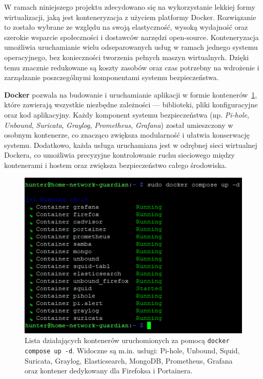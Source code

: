 \documentclass[
    left=2.5cm,         %
    right=2.5cm,        %
    top=2.5cm,          %
    bottom=3cm,         %
    bindingoffset=6mm,  %
    nohyphenation=true %
]{eiti/eiti-thesis} %
\begin{document}
W ramach niniejszego projektu zdecydowano się na wykorzystanie lekkiej formy wirtualizacji, jaką jest konteneryzacja z użyciem platformy Docker\cite{docker-wiki}. Rozwiązanie to zostało wybrane ze względu na swoją elastyczność, wysoką wydajność oraz szerokie wsparcie społeczności i dostawców narzędzi open-source. Konteneryzacja umożliwia uruchamianie wielu odseparowanych usług w ramach jednego systemu operacyjnego, bez konieczności tworzenia pełnych maszyn wirtualnych. Dzięki temu znacznie redukowane są koszty zasobów oraz czas potrzebny na wdrożenie i zarządzanie poszczególnymi komponentami systemu bezpieczeństwa.

\textbf{Docker} pozwala na budowanie i uruchamianie aplikacji w formie kontenerów~\ref{fig:hunter-docker}, które zawierają wszystkie niezbędne zależności — biblioteki, pliki konfiguracyjne oraz kod aplikacyjny. Każdy komponent systemu bezpieczeństwa (np. \textit{Pi-hole}, \textit{Unbound}, \textit{Suricata}, \textit{Graylog}, \textit{Prometheus}, \textit{Grafana}) został umieszczony w osobnym kontenerze, co znacząco zwiększa modularność i ułatwia konserwację systemu. Dodatkowo, każda usługa uruchamiana jest w odrębnej sieci wirtualnej Dockera, co umożliwia precyzyjne kontrolowanie ruchu sieciowego między kontenerami i hostem oraz zwiększa bezpieczeństwo całego środowiska.
\begin{figure}[H]
    \centering
    \includegraphics[width=\textwidth]{img/docker.png}
    \caption{Lista działających kontenerów uruchomionych za pomocą \texttt{docker compose up -d}. Widoczne są m.in. usługi: Pi-hole, Unbound, Squid, Suricata, Graylog, Elasticsearch, MongoDB, Prometheus, Grafana oraz kontener dedykowany dla Firefoksa i Portainera.}
    \label{fig:hunter-docker}
\end{figure}
\end{document}
